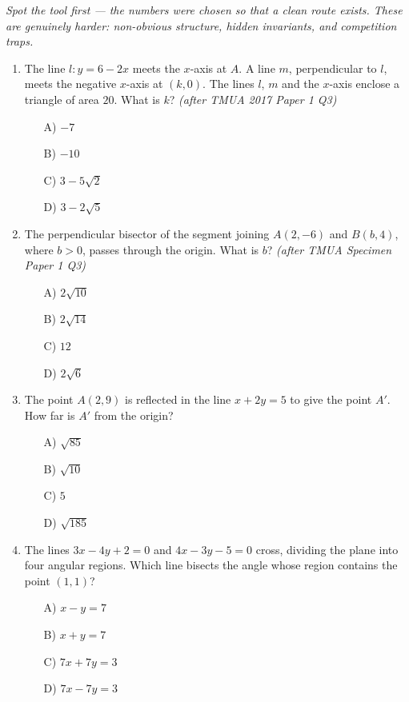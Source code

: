 \documentclass[11pt,a4paper]{article}
\begin{document}
\noindent\textit{Spot the tool first --- the numbers were chosen so that a clean route exists. These are genuinely harder: non-obvious structure, hidden invariants, and competition traps.}

\begin{enumerate}

\item The line $l: y = 6 - 2x$ meets the $x$-axis at $A$. A line $m$, perpendicular to $l$, meets the negative $x$-axis at $(k,0)$. The lines $l$, $m$ and the $x$-axis enclose a triangle of area $20$. What is $k$? \textit{\small(after TMUA 2017 Paper 1 Q3)}
\begin{itemize}
\item[A)] $-7$
\item[B)] $-10$
\item[C)] $3-5\sqrt2$
\item[D)] $3-2\sqrt5$
\end{itemize}

\item The perpendicular bisector of the segment joining $A(2,-6)$ and $B(b,4)$, where $b>0$, passes through the origin. What is $b$? \textit{\small(after TMUA Specimen Paper 1 Q3)}
\begin{itemize}
\item[A)] $2\sqrt{10}$
\item[B)] $2\sqrt{14}$
\item[C)] $12$
\item[D)] $2\sqrt6$
\end{itemize}

\item The point $A(2,9)$ is reflected in the line $x+2y=5$ to give the point $A'$. How far is $A'$ from the origin?
\begin{itemize}
\item[A)] $\sqrt{85}$
\item[B)] $\sqrt{10}$
\item[C)] $5$
\item[D)] $\sqrt{185}$
\end{itemize}

\item The lines $3x-4y+2=0$ and $4x-3y-5=0$ cross, dividing the plane into four angular regions. Which line bisects the angle whose region contains the point $(1,1)$?
\begin{itemize}
\item[A)] $x-y=7$
\item[B)] $x+y=7$
\item[C)] $7x+7y=3$
\item[D)] $7x-7y=3$
\end{itemize}


\end{enumerate}
\end{document}
